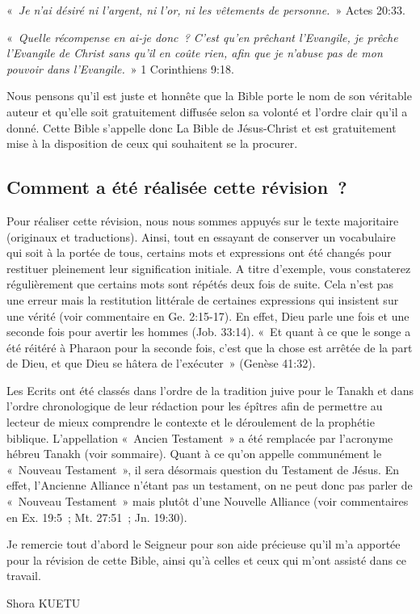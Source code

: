 \begin{small}
«~\emph{Je n'ai désiré ni l'argent, ni l'or, ni les vêtements de personne.}~» Actes 20:33.\bigskip

«~\emph{Quelle récompense en ai-je donc~? C’est qu’en prêchant l’Evangile, je prêche l’Evangile de Christ sans qu’il en coûte rien, afin que je n’abuse pas de mon pouvoir dans l’Evangile.}~» 1 Corinthiens 9:18.\bigskip

Nous pensons qu'il est juste et honnête que la Bible porte le nom de son véritable auteur et qu'elle soit gratuitement diffusée selon sa volonté et l'ordre clair qu'il a donné. Cette Bible s'appelle donc La Bible de Jésus-Christ et est gratuitement mise à la disposition de ceux qui souhaitent se la procurer.\bigskip

\subsection*{Comment a été réalisée cette révision~?}

Pour réaliser cette révision, nous nous sommes appuyés sur le texte majoritaire (originaux et traductions). Ainsi, tout en essayant de conserver un vocabulaire qui soit à la portée de tous, certains mots et expressions ont été changés pour restituer pleinement leur signification initiale. A titre d'exemple, vous constaterez régulièrement que certains mots sont répétés deux fois de suite. Cela n'est pas une erreur mais la restitution littérale de certaines expressions qui insistent sur une vérité (voir commentaire en Ge. 2:15-17). En effet, Dieu parle une fois et une seconde fois pour avertir les hommes (Job. 33:14). «~Et quant à ce que le songe a été réitéré à Pharaon pour la seconde fois, c'est que la chose est arrêtée de la part de Dieu, et que Dieu se hâtera de l'exécuter~» (Genèse 41:32).\bigskip

Les Ecrits ont été classés dans l'ordre de la tradition juive pour le Tanakh et dans l'ordre chronologique de leur rédaction pour les épîtres afin de permettre au lecteur de mieux comprendre le contexte et le déroulement de la prophétie biblique. L'appellation «~Ancien Testament~» a été remplacée par l'acronyme hébreu Tanakh (voir sommaire). Quant à ce qu'on appelle communément le «~Nouveau Testament~», il sera désormais question du Testament de Jésus. En effet, l'Ancienne Alliance n'étant pas un testament, on ne peut donc pas parler de «~Nouveau Testament~» mais plutôt d'une Nouvelle Alliance (voir commentaires en Ex. 19:5~; Mt. 27:51~; Jn. 19:30).\bigskip

Je remercie tout d'abord le Seigneur pour son aide précieuse qu'il m'a apportée pour la révision de cette Bible, ainsi qu'à celles et ceux qui m’ont assisté dans ce travail.\newline

\begin{flushright}
Shora KUETU
\end{flushright}
\end{small}
